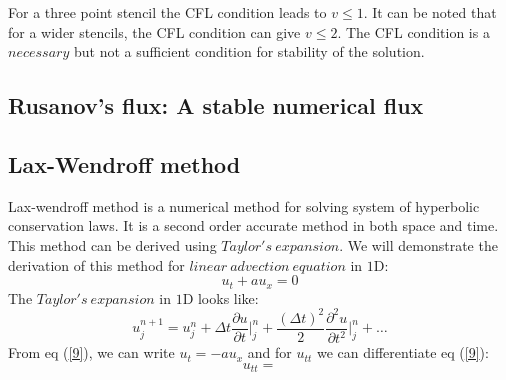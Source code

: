 For a three point stencil the CFL condition leads to $v \leq 1$. It can be noted that for a wider stencils, the CFL condition can give $v \leq 2$. The CFL condition is a $necessary$ but not a sufficient condition for stability of the solution.
\subsection{Rusanov's flux: A stable numerical flux}

\subsection{Lax-Wendroff method}
Lax-wendroff method is a numerical method for solving system of hyperbolic conservation laws. It is a second order accurate method in both space and time. This method can be derived using
$Taylor's~expansion.$ We will demonstrate the derivation of this method for $linear~advection~equation$ in $1$D:
\begin{equation} \label{9}
    u_t + au_x = 0
\end{equation}
The $Taylor's~expansion$ in $1$D looks like:
\begin{equation}
    u_j^{n+1} = u_j^n + \Delta t \frac{\partial u}{\partial t}\bigg\vert_j^n + \frac{(\Delta t)^2}{2}\frac{\partial^2 u}{\partial t^2}\bigg\vert_j^n + \dots
\end{equation}
From eq (\ref{9}), we can write $ u_t = -au_x$ and for $u_{tt}$ we can differentiate eq (\ref{9}):
\begin{equation}
    u_{tt} = 
\end{equation}
